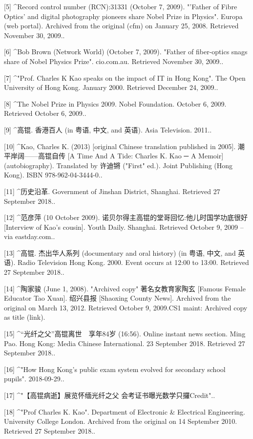 [5]
^Record control number (RCN):31331 (October 7, 2009). "'Father of Fibre Optics' and digital photography pioneers share Nobel Prize in Physics". Europa (web portal). Archived from the original (cfm) on January 25, 2008. Retrieved November 30, 2009..

[6]
^Bob Brown (Network World) (October 7, 2009). "Father of fiber-optics snags share of Nobel Physics Prize". cio.com.au. Retrieved November 30, 2009..

[7]
^"Prof. Charles K Kao speaks on the impact of IT in Hong Kong". The Open University of Hong Kong. January 2000. Retrieved December 24, 2009..

[8]
^The Nobel Prize in Physics 2009. Nobel Foundation. October 6, 2009. Retrieved October 6, 2009..

[9]
^高锟. 香港百人 (in 粤语, 中文, and 英语). Asia Television. 2011..

[10]
^Kao, Charles K. (2013) [original Chinese translation published in 2005]. 潮平岸阔——高锟自传 [A Time And A Tide: Charles K. Kao ─ A Memoir] (autobiography). Translated by 许迪锵 ("First" ed.). Joint Publishing (Hong Kong). ISBN 978-962-04-3444-0..

[11]
^历史沿革. Government of Jinshan District, Shanghai. Retrieved 27 September 2018..

[12]
^范彦萍 (10 October 2009). 诺贝尔得主高锟的堂哥回忆:他儿时国学功底很好 [Interview of Kao's cousin]. Youth Daily. Shanghai. Retrieved October 9, 2009 – via eastday.com..

[13]
^高锟. 杰出华人系列 (documentary and oral history) (in 粤语, 中文, and 英语). Radio Television Hong Kong. 2000. Event occurs at 12:00 to 13:00. Retrieved 27 September 2018..

[14]
^陶家骏 (June 1, 2008). "Archived copy" 著名女教育家陶玄 [Famous Female Educator Tao Xuan]. 绍兴县报 [Shaoxing County News]. Archived from the original on March 13, 2012. Retrieved October 9, 2009.CS1 maint: Archived copy as title (link).

[15]
^“光纤之父”高锟离世　享年84岁 (16:56). Online instant news section. Ming Pao. Hong Kong: Media Chinese International. 23 September 2018. Retrieved 27 September 2018..

[16]
^"How Hong Kong's public exam system evolved for secondary school pupils". 2018-09-29..

[17]
^"【高锟病逝】展览怀缅光纤之父 会考证书曝光数学只攞Credit"..

[18]
^"Prof Charles K. Kao". Department of Electronic & Electrical Engineering. University College London. Archived from the original on 14 September 2010. Retrieved 27 September 2018..

